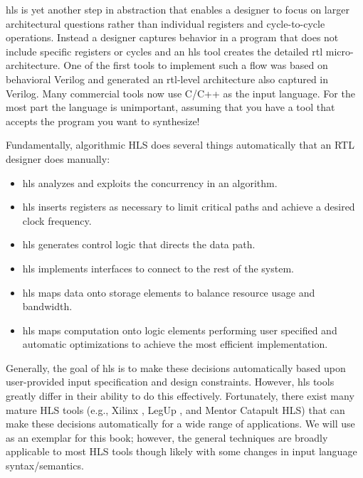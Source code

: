  \Gls{hls} is yet another step in abstraction that enables a designer to focus on larger architectural questions rather than individual registers and cycle-to-cycle operations.  Instead a designer captures behavior in a program that does not include specific registers or cycles and an \gls{hls} tool creates the detailed \gls{rtl} micro-architecture.  One of the first tools to implement such a flow was based on behavioral Verilog and generated an \gls{rtl}-level architecture also captured in Verilog\cite{knapp96bc}.  Many commercial tools now use C/C++ as the input language.  For the most part the language is unimportant, assuming that you have a tool that accepts the program you want to synthesize!

Fundamentally, algorithmic HLS does several things automatically that an RTL designer does manually:
\begin{itemize}
\item \gls{hls} analyzes and exploits the concurrency in an algorithm.
\item \gls{hls} inserts registers as necessary to limit critical paths and achieve a desired clock frequency.
\item \gls{hls} generates control logic that directs the data path.
\item \gls{hls} implements interfaces to connect to the rest of the system.
\item \gls{hls} maps data onto storage elements to balance resource usage and bandwidth.
\item \gls{hls} maps computation onto logic elements performing user specified and automatic optimizations to achieve the most efficient implementation.
\end{itemize}

Generally, the goal of \gls{hls} is to make these decisions automatically based upon user-provided input specification and design constraints.  However, \gls{hls} tools greatly differ in their ability to do this effectively.  Fortunately, there exist many mature HLS tools (e.g., Xilinx \VHLS, LegUp \cite{canis2011legup}, and Mentor Catapult HLS) that can make these decisions automatically for a wide range of applications. We will use \VHLS as an exemplar for this book; however, the general techniques are broadly applicable to most HLS tools though likely with some changes in input language syntax/semantics. %

